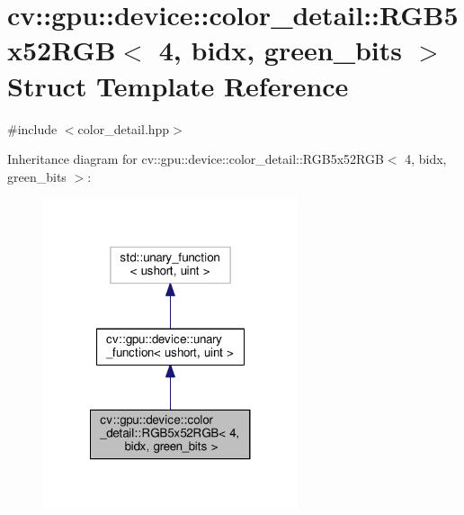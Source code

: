 \hypertarget{structcv_1_1gpu_1_1device_1_1color__detail_1_1RGB5x52RGB_3_014_00_01bidx_00_01green__bits_01_4}{\section{cv\-:\-:gpu\-:\-:device\-:\-:color\-\_\-detail\-:\-:R\-G\-B5x52\-R\-G\-B$<$ 4, bidx, green\-\_\-bits $>$ Struct Template Reference}
\label{structcv_1_1gpu_1_1device_1_1color__detail_1_1RGB5x52RGB_3_014_00_01bidx_00_01green__bits_01_4}
}


{\ttfamily \#include $<$color\-\_\-detail.\-hpp$>$}



Inheritance diagram for cv\-:\-:gpu\-:\-:device\-:\-:color\-\_\-detail\-:\-:R\-G\-B5x52\-R\-G\-B$<$ 4, bidx, green\-\_\-bits $>$\-:\nopagebreak
\begin{figure}[H]
\begin{center}
\leavevmode
\includegraphics[width=212pt]{structcv_1_1gpu_1_1device_1_1color__detail_1_1RGB5x52RGB_3_014_00_01bidx_00_01green__bits_01_4__inherit__graph}
\end{center}
\end{figure}



